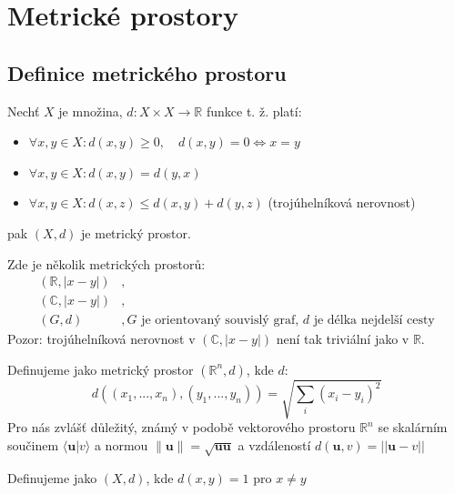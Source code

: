 \documentclass[../main.tex]{subfiles}
\begin{document}
\section{Metrické prostory}
\subsection{Definice metrického prostoru}

\begin{definition}
	Nechť $X$ je množina,  $d: X \times X \rightarrow \mathbb{R}$ funkce t. ž. platí:
	
	\begin{itemize}
	\item{$\forall x,y \in X : d(x,y) \geq 0, \quad d(x,y) = 0 \iff x = y$ }
	\item{$\forall x,y \in X : d(x,y) = d(y,x)$}
	\item{$\forall x,y \in X : d(x,z) \leq d(x,y) + d(y,z)$ (trojúhelníková nerovnost)}
	\end{itemize}
	pak $(X,d)$ je metrický prostor.
\end{definition}

\begin{example}
	Zde je několik metrických prostorů:
	\begin{align*} 
	    (\mathbb{R}, |x-y|) &,\\
	    (\mathbb{C},|x-y|) &,\\
	    (G,d) &, G \text{ je orientovaný souvislý graf, } d \text{ je délka nejdelší cesty}
	\end{align*}%
	Pozor: trojúhelníková nerovnost v $(\mathbb{C}, |x-y|)$ není tak triviální jako v $\mathbb{R}$.
\end{example}

\begin{definition}
Definujeme jako metrický prostor $(\mathbb{R}^n,d)$, kde $d$:
\[d((x_1,...,x_n),(y_1,...,y_n)) = \sqrt{\sum_i(x_i-y_i)^2}\]
Pro nás zvlášť důležitý, známý v podobě vektorového prostoru $\mathbb{R}^n$ se skalárním součinem $\langle \textbf{u} | v \rangle$ a normou
$\|\textbf{u}\| = \sqrt{\textbf{uu}}$ a vzdáleností $d(\textbf{u},v) = ||\textbf{u}-v||$
\end{definition}

\begin{definition}
	Definujeme jako $(X,d)$, kde $d(x,y) = 1$ pro $x \neq y$
\end{definition}
\end{document}
